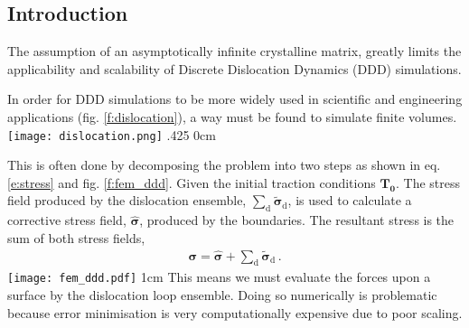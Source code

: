 \begin{multicols}{2}
	{\fontsize{37}{44.4}\selectfont
	\section{Introduction}
		The assumption of an asymptotically infinite crystalline matrix, greatly limits the applicability and scalability of Discrete Dislocation Dynamics (DDD) simulations.
		
		In order for DDD simulations to be more widely used in scientific and engineering applications (fig. \ref{f:dislocation}), a way must be found to simulate finite volumes.
		{%
			\texttt{[image: dislocation.png]}
		}{\quad}{.425\linewidth}
		{%
			\label{f:dislocation}
		}{0cm}
				
		This is often done by decomposing the problem into two steps as shown in eq. \ref{e:stress} and fig. \ref{f:fem_ddd}. Given the initial traction conditions $ \bm{T_{0}} $. The stress field produced by the dislocation ensemble, $ \sum_{\textrm{d}} \bm{\tilde{\sigma}}_{\textrm{d}} $, is used to calculate a corrective stress field, $ \bm{\hat{\sigma}} $, produced by the boundaries. The resultant stress is the sum of both stress fields,
		\begin{align}
			\bm{\sigma} = \bm{\hat{\sigma}} + \sum\limits_{\textrm{d}} \bm{\tilde{\sigma}}_{\textrm{d}}\,.\label{e:stress}
		\end{align}
		{%
			\texttt{[image: fem\_ddd.pdf]}%
			\label{f:fem_ddd}
		}{1cm}
		This means we must evaluate the forces upon a surface by the dislocation loop ensemble. Doing so numerically is problematic because error minimisation is very computationally expensive due to poor scaling.
		
}
\end{multicols}
